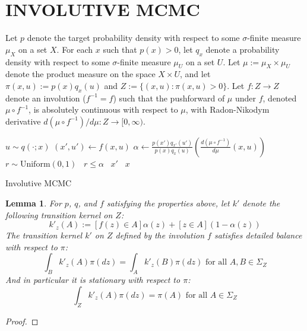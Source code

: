 \documentclass[twoside]{article}
\newtheorem{lemma}[theorem]{Lemma}
\begin{document}
\section{INVOLUTIVE MCMC}
Let $p$ denote the target probability density with respect to some $\sigma$-finite measure $\mu_X$ on a set $X$.
For each $x$ such that $p(x) > 0$, let $q_x$ denote a probability density with respect to some $\sigma$-finite measure $\mu_U$ on a set $U$.
Let $\mu := \mu_X \times \mu_U$ denote the product measure on the space $X \times U$, and let $\pi(x, u) := p(x) q_x(u)$ and $Z := \{(x, u) : \pi(x, u) > 0\}$.
Let $f : Z \to Z$ denote an involution ($f^{-1} = f$) such that the pushforward of $\mu$ under $f$, denoted $\mu \circ f^{-1}$, is absolutely continuous with respect to $\mu$, with Radon-Nikodym derivative $d (\mu \circ f^{-1}) / d\mu : Z \to [0, \infty)$.

\begin{algorithm}[h]
\begin{algorithmic}
    \State $u \sim q(\cdot; x)$ 
    \State $(x', u') \gets f(x, u)$ 
    \State $\alpha \gets
        \displaystyle \frac{p(x') q_{x'}(u')}{p(x) q_{x}(u)} \left( \frac{d (\mu \circ f^{-1})}{d \mu} (x, u)\right)$
    \State $r \sim \mathrm{Uniform}(0, 1)$
    \State \algorithmicif \, $r \le \alpha$ \algorithmicthen \, \Return $x'$ \algorithmicelse \, \Return $x$ 
\EndProcedure
\end{algorithmic}
\caption{Involutive MCMC}
\label{alg:involutive-mcmc}
\end{algorithm}

\begin{lemma}\label{lemma:involution-detailed-balance} %
For $p$, $q$, and $f$ satisfying the properties above, let $k'$ denote the following transition kernel on $Z$:
\[
k'_z(A) := [f(z) \in A] \alpha(z) + [z \in A](1 - \alpha(z))
\]
The transition kernel $k'$ on $Z$ defined by the involution $f$ satisfies detailed balance with respect to $\pi$:
\[
\int_B k'_z(A) \pi(dz) = \int_A k'_z(B) \pi(dz) \mbox{ for all } A, B \in \Sigma_Z
\]
And in particular it is stationary with respect to $\pi$:
\[
\int_Z k'_z(A) \pi(dz) = \pi(A) \mbox{ for all } A \in \Sigma_Z
\]
\end{lemma}
\begin{proof}
\end{proof}
\end{document}
